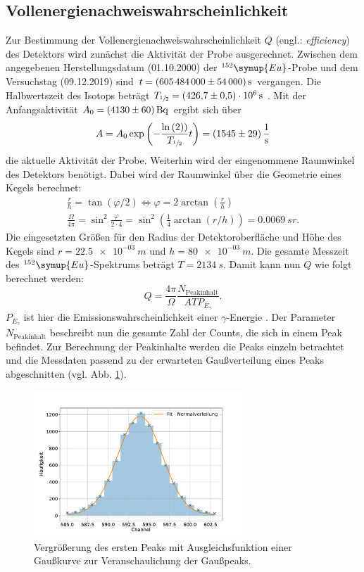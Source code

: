 \subsection{Vollenergienachweiswahrscheinlichkeit}
Zur Bestimmung der Vollenergienachweiswahrscheinlichkeit $Q$ (engl.: \textit{efficiency}) des Detektors wird zunächst die Aktivität der Probe ausgerechnet.
Zwischen dem angegebenen Herstellungsdatum (01.10.2000) \cite{anleitung} der $^{152}\symup{Eu}$-Probe und dem Versuchstag (09.12.2019) sind $t = \SI{605484000 (54000)}{s}$ vergangen.
Die Halbwertszeit des Isotops beträgt $T_{\sfrac{1}{2}} = \SI{426.7 (5) e+06}{s}$ \cite{nucleide}.
Mit der Anfangsaktivität $A_{0} = \SI{4130 (60)}{Bq}$ ergibt sich über
\begin{equation}
	A = A_{0} \exp{\left( - \frac{\ln{(2))}}{T_{\sfrac{1}{2}}} t \right)} = \SI{1545(29)}{\per \second}
	\label{result:aktivität}
\end{equation}
die aktuelle Aktivität der Probe.
Weiterhin wird der eingenommene Raumwinkel des Detektors benötigt.
Dabei wird der Raumwinkel über die Geometrie eines Kegels berechnet:
\begin{align*}
	\frac{r}{h} = \tan{( \varphi / 2 )} \Leftrightarrow \varphi = 2 \arctan{(\frac{r}{h})} \\
	\frac{\Omega}{4 \pi} = \sin^2{\frac{\varphi}{2 \cdot 4}} =  \sin^2{ \left( \frac{1}{4} \arctan{(r/h)} \right)} = \SI{0.0069}{sr}.
	\label{result:raumwinkel}
\end{align*}
Die eingesetzten Größen für den Radius der Detektoroberfläche und Höhe des Kegels sind $r = \SI{22.5e-03}{m}$ und $h = \SI{80e-03}{m}$.
Die gesamte Messzeit des $^{152}\symup{Eu}$-Spektrums beträgt $T=\SI{2134}{s}$.
Damit kann nun $Q$ wie folgt berechnet werden:
\begin{equation}
	Q = \frac{4 \pi}{\Omega} \frac{N_{\text{Peakinhalt}}}{ A T P_{E_{\gamma}}}.
\end{equation}
$P_{E_{\gamma}}$ ist hier die Emissionswahrscheinlichkeit einer $\gamma$-Energie \cite{nucleide}.
Der Parameter $N_{\text{Peakinhalt}}$ beschreibt nun die gesamte Zahl der Counts, die sich in einem Peak befindet.
Zur Berechnung der Peakinhalte werden die Peaks einzeln betrachtet und die Messdaten passend zu der erwarteten Gaußverteilung eines Peaks abgeschnitten (vgl. Abb. \ref{fig:einzelnergaussfit_0}).
\begin{figure}[h!]
  \centering
  \includegraphics[width=0.7\textwidth]{content/images/einzelnergaussfit_0.pdf}
  \caption{Vergrößerung des ersten Peaks mit Ausgleichsfunktion einer Gaußkurve zur Veranschaulichung der Gaußpeaks.}
  \label{fig:einzelnergaussfit_0}
\end{figure}
